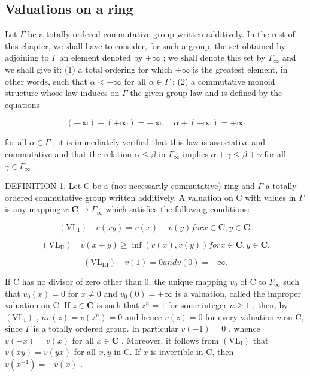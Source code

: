 \subsection{Valuations on a ring}

Let \(\Gamma\) be a totally ordered commutative group written additively. In the rest of this chapter, we shall have to consider, for such a group, the set obtained by adjoining to \(\Gamma\) an element denoted by \(+\infty\) ; we shall denote this set by \(\Gamma_{\infty}\) and we shall give it: (1) a total ordering for which \(+\infty\) is the greatest element, in other words, such that \(\alpha < +\infty\) for all \(\alpha \in \Gamma\) ; (2) a commutative monoid structure whose law induces on \(\Gamma\) the given group law and is defined by the equations

\[
(+ \infty) + (+ \infty) = + \infty , \quad \alpha + (+ \infty) = + \infty
\]

for all \(\alpha \in \Gamma\) ; it is immediately verified that this law is associative and commutative and that the relation \(\alpha \leqslant \beta\) in \(\Gamma_{\infty}\) implies \(\alpha + \gamma \leqslant \beta + \gamma\) for all \(\gamma \in \Gamma_{\infty}\) .

DEFINITION 1. Let C be a (not necessarily commutative) ring and \(\Gamma\) a totally ordered commutative group written additively. A valuation on C with values in \(\Gamma\) is any mapping \(v: \mathbf{C} \to \Gamma_{\infty}\) which satisfies the following conditions:

\[
(\mathrm{VL}_{\mathrm{I}}) \quad v (x y) = v (x) + v (y) for x \in \mathbf {C}, y \in \mathbf {C}.
\]

\[
(\mathrm{VL}_{\mathrm{II}}) \quad v (x + y) \geqslant \inf (v (x), v (y)) for x \in \mathbf {C}, y \in \mathbf {C}.
\]

\[
(\mathrm{VL} _ {\mathrm{III}}) \quad v (1) = 0 and v (0) = + \infty .
\]

If C has no divisor of zero other than 0, the unique mapping \(v_0\) of C to \(\Gamma_\infty\) such that \(v_0(x) = 0\) for \(x \neq 0\) and \(v_0(0) = +\infty\) is a valuation, called the improper valuation on C. If \(z \in \mathbf{C}\) is such that \(z^n = 1\) for some integer \(n \geqslant 1\) , then, by \((\mathrm{VL}_{\mathrm{I}})\) , \(nv(z) = v(z^n) = 0\) and hence \(v(z) = 0\) for every valuation \(v\) on C, since \(\Gamma\) is a totally ordered group. In particular \(v(-1) = 0\) , whence \(v(-x) = v(x)\) for all \(x \in \mathbf{C}\) . Moreover, it follows from \((\mathrm{VL}_{\mathrm{I}})\) that \(v(xy) = v(yx)\) for all \(x, y\) in C. If \(x\) is invertible in C, then \(v(x^{-1}) = -v(x)\) .


